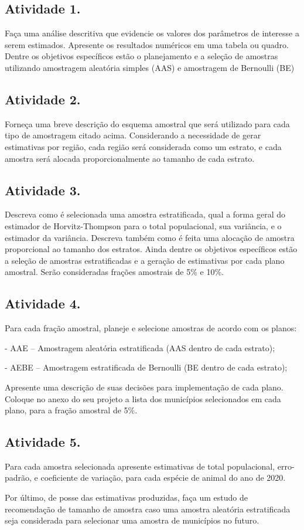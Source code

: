 \documentclass[a4paper,11pt,oneside,twocolumn]{Config/milktest}
\begin{document}
\subsection*{Atividade 1.} 
Faça uma análise descritiva que evidencie os valores dos parâmetros de interesse a serem estimados. Apresente os resultados numéricos em uma tabela ou quadro. Dentre os objetivos específicos estão o planejamento e a seleção de amostras utilizando amostragem aleatória simples (AAS) e amostragem de Bernoulli (BE) 

\subsection*{ Atividade 2.} 

Forneça uma breve descrição do esquema amostral que será utilizado para cada tipo de amostragem citado acima.  Considerando a necessidade de gerar estimativas por região, cada região será considerada como um estrato, e cada amostra será alocada proporcionalmente ao tamanho de cada estrato.  

\subsection*{Atividade 3.}

Descreva como é selecionada uma amostra estratificada, qual a forma geral do estimador de Horvitz-Thompson para o total populacional, sua variância, e o estimador da variância. Descreva também como é feita uma alocação de amostra proporcional ao tamanho dos estratos. Ainda dentre os objetivos específicos estão a seleção de amostras estratificadas e a geração de estimativas por cada plano amostral. Serão consideradas frações amostrais de 5\% e 10\%. 


\subsection*{ Atividade 4.} 
Para cada fração amostral, planeje e selecione amostras de acordo com os planos:

- AAE – Amostragem aleatória estratificada (AAS dentro de cada estrato);

- AEBE – Amostragem estratificada de Bernoulli (BE dentro de cada estrato);


Apresente uma descrição de suas decisões para implementação de cada plano. Coloque no anexo do seu projeto a lista dos municípios selecionados em cada plano, para a fração amostral de 5\%. 

\subsection*{Atividade 5. }
Para cada amostra selecionada apresente estimativas de total populacional, erro-padrão, e coeficiente de variação, para cada espécie de animal do ano de 2020. 

Por último, de posse das estimativas produzidas, faça um estudo de recomendação de tamanho de amostra caso uma amostra aleatória estratificada seja considerada para selecionar uma amostra de municípios no futuro.

\bigskip


\centering\color{cor}{\scshape boa prova}
\end{document}
